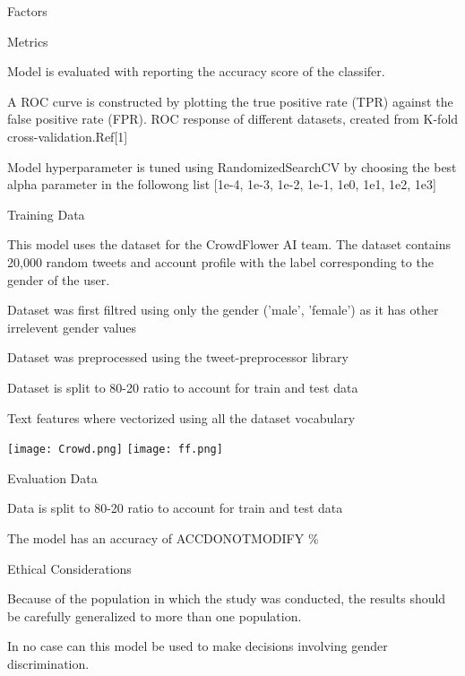 \documentclass{article}
\begin{document}
\begin{adjustwidth}{-60pt}{-30pt}
\begin{singlespace}
\begin{tcolorbox}[title=\textbf{Model Card - Tweeter Gender Classification },
     breakable, sharp corners, boxrule=0.7pt]
{\begin{mcsection}{Factors}
 \end{mcsection}
 
 \begin{mcsection}{Metrics}
     \item Model is evaluated with reporting the accuracy score of the classifer.
     
     \item A ROC curve is constructed by plotting the true positive rate (TPR) against the false positive rate (FPR). ROC response of different datasets, created from K-fold cross-validation.Ref[1]
     \item Model hyperparameter is tuned using RandomizedSearchCV by choosing the best alpha parameter in the followong list [1e-4, 1e-3, 1e-2, 1e-1, 1e0, 1e1, 1e2, 1e3]
     
 \end{mcsection}
 
 \begin{mcsection}{Training Data}
     \item This model uses the dataset for the CrowdFlower AI team.  The dataset contains 20,000 random tweets and account profile with the label corresponding to the gender of the user.
     \item Dataset was first filtred using only the gender ('male', 'female') as it has other irrelevent gender values
     \item Dataset was preprocessed using the tweet-preprocessor library 
     \item Dataset is split to 80-20 ratio to account for train and test data
     \item Text features where vectorized using all the dataset vocabulary 

 \end{mcsection}
     \texttt{[image: Crowd.png]}
    \texttt{[image: ff.png]}
 
 \begin{mcsection}{Evaluation Data}
   
     \item Data is split to 80-20 ratio to account for train and test data
     \item The model has an accuracy of ACCDONOTMODIFY \%
  

 \end{mcsection}
 
 
 \begin{mcsection}{Ethical Considerations}
     \item Because of the population in which the study was conducted, the results should be carefully generalized to more than one population.
     \item In no case can this model be used to make decisions involving gender discrimination.
 \end{mcsection}
 
}
\end{tcolorbox}
\end{singlespace}
\end{adjustwidth}
\end{document}
